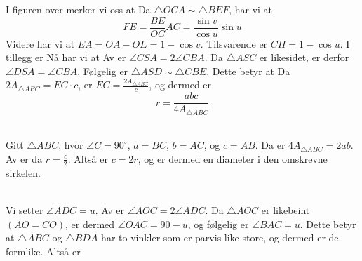 \newpage
{}
I figuren over merker vi oss at
Da $ \triangle OCA \sim \triangle BEF $, har vi at
\[ FE=\frac{BE}{OC}AC=\frac{\sin v}{\cos u}\sin u \]
Videre har vi at $ EA=OA-OE=1-\cos v $. Tilsvarende er $ CH=1-\cos u $. I tillegg er 
Nå har vi at
\newpage
{}
Av  er $ \angle CSA=2\angle CBA $. Da $ \triangle ASC $ er likesidet, er derfor $ \angle DSA=\angle CBA $. Følgelig er $ \triangle ASD\sim \triangle CBE $. Dette betyr at
Da $ 2A_{\triangle ABC}=EC\cdot c $, er $ EC=\frac{2A_{\triangle ABC}}{c} $, og dermed er
\[ r=\frac{abc}{4A_{\triangle ABC}} \]


 \\
Gitt $ \triangle ABC$, hvor $ \angle C=90^\circ $, $ a=BC $, $ b=AC $, og $ c=AB $. Da er $ 4A_{\triangle ABC}=2ab $.
Av  er da $  r=\frac{c}{2} $. Altså er $ c=2r $, og er dermed en diameter i den omskrevne sirkelen.

\\
Vi setter $ \angle ADC=u $. Av  er $ \angle AOC=2\angle ADC $. Da $ \triangle AOC $ er likebeint $ (AO=CO) $, er dermed $ \angle OAC= 90-u $, og følgelig er $ \angle BAC=u $. Dette betyr at $ \triangle ABC $ og $ \triangle BDA $ har to vinkler som er parvis like store, og dermed er de formlike. Altså er




